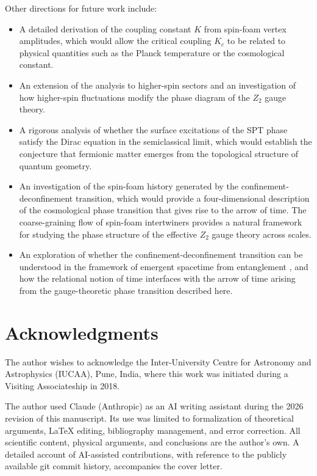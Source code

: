 \documentclass[preprint]{SciPost}
\theoremstyle{plain} %
\begin{document}
Other directions for future work include:
\begin{itemize}
	\item A detailed derivation of the coupling constant $ K $ from spin-foam vertex amplitudes, which would allow the critical coupling $ K_c $ to be related to physical quantities such as the Planck temperature or the cosmological constant.
	\item An extension of the analysis to higher-spin sectors and an investigation of how higher-spin fluctuations modify the phase diagram of the $ Z_2 $ gauge theory.
	\item A rigorous analysis of whether the surface excitations of the SPT phase satisfy the Dirac equation in the semiclassical limit, which would establish the conjecture that fermionic matter emerges from the topological structure of quantum geometry.
	\item An investigation of the spin-foam history generated by the confinement-deconfinement transition, which would provide a four-dimensional description of the cosmological phase transition that gives rise to the arrow of time. The coarse-graining flow of spin-foam intertwiners \cite{Dittrich2016Coarse} provides a natural framework for studying the phase structure of the effective $ Z_2 $ gauge theory across scales.
	\item An exploration of whether the confinement-deconfinement transition can be understood in the framework of emergent spacetime from entanglement \cite{Cao2018Bulk}, and how the relational notion of time \cite{Hohn2021The-Trinity} interfaces with the arrow of time arising from the gauge-theoretic phase transition described here.
\end{itemize}

\section*{Acknowledgments}

The author wishes to acknowledge the Inter-University Centre for Astronomy and Astrophysics (IUCAA), Pune, India, where this work was initiated during a Visiting Associateship in 2018.

The author used Claude (Anthropic) as an AI writing assistant during the 2026 revision of this manuscript. Its use was limited to formalization of theoretical arguments, LaTeX editing, bibliography management, and error correction. All scientific content, physical arguments, and conclusions are the author's own. A detailed account of AI-assisted contributions, with reference to the publicly available git commit history, accompanies the cover letter.
\end{document}
